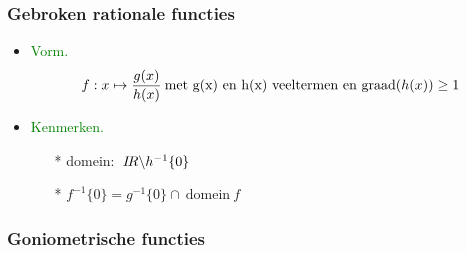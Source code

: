 \subsubsection{Gebroken rationale functies} \label{rationale_functies}
			\begin{itemize}%
			\item\textcolor{green}{Vorm.}\newline
			\[f:x\mapsto \displaystyle\frac{\displaystyle g(x)}{\displaystyle h(x)} \:\mbox{met g(x) en h(x) veeltermen 			en graad}(h(x))\geq 1\]
			\item \textcolor{green}{Kenmerken.}\newline
				\begin{itemize}
				\item[*] domein: $\:\mbox{$I\!R$} \backslash h^{-1}\{0\}$
				\item[*] $f^{-1}\{0\}=g^{-1}\{0\}\cap \:\mbox{domein}\:f$
				\end{itemize} 
			\end{itemize}%

\hypertarget{goniometrische_functies}{}
\subsubsection{Goniometrische functies} \label{goniometrische_functies}

